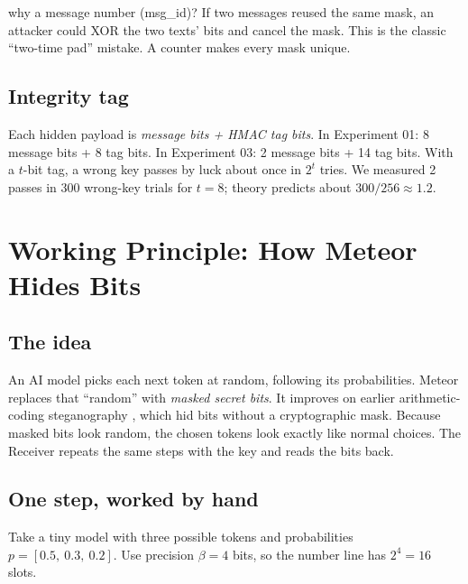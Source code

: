 \documentclass[11pt,a4paper]{article}
\begin{document}
\begin{plain}{why a message number (msg\_id)?}
If two messages reused the same mask, an attacker could XOR the two texts' bits and cancel the mask.
This is the classic ``two-time pad'' mistake. A counter makes every mask unique.
\end{plain}

\subsection{Integrity tag}
Each hidden payload is \emph{message bits + HMAC tag bits}.
In Experiment 01: 8 message bits + 8 tag bits. In Experiment 03: 2 message bits + 14 tag bits.
With a $t$-bit tag, a wrong key passes by luck about once in $2^t$ tries.
We measured 2 passes in 300 wrong-key trials for $t=8$; theory predicts about $300/256 \approx 1.2$.

\section{Working Principle: How Meteor Hides Bits}
\subsection{The idea}
An AI model picks each next token at random, following its probabilities.
Meteor replaces that ``random'' with \emph{masked secret bits}. It improves on earlier arithmetic-coding steganography \cite{ziegler2019}, which hid bits without a cryptographic mask.
Because masked bits look random, the chosen tokens look exactly like normal choices.
The Receiver repeats the same steps with the key and reads the bits back.

\subsection{One step, worked by hand}
Take a tiny model with three possible tokens and probabilities $p = [0.5,\ 0.3,\ 0.2]$.
Use precision $\beta = 4$ bits, so the number line has $2^4 = 16$ slots.
\end{document}
